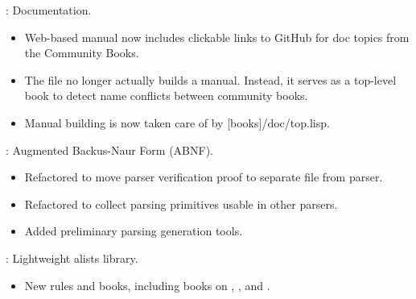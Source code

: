 \begin{frame}

\implibtitle

:
Documentation.
\begin{itemize}
\item Web-based manual now includes clickable links to GitHub for doc topics
      from the Community Books.
\item The file  no longer actually builds a
      manual.  Instead, it serves as a top-level book to detect name conflicts
      between community books.
\item Manual building is now taken care of by [books]/doc/top.lisp.
\end{itemize}

\end{frame}


\begin{frame}

\implibtitle

:
Augmented Backus-Naur Form (ABNF).
\begin{itemize}
\item Refactored to move parser verification proof to separate file from parser.
\item Refactored to collect parsing primitives usable in other parsers.
\item Added preliminary parsing generation tools.
\end{itemize}

\end{frame}


\begin{frame}

\implibtitle

:
Lightweight alists library.
\begin{itemize}
\item New rules and books, including books on ,
  , and .
\end{itemize}

\end{frame}



